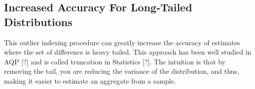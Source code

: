 \subsection{Increased Accuracy For Long-Tailed Distributions}

This outlier indexing procedure can greatly increase the accuracy
of estimates where the set of difference is heavy tailed. This approach
has been well studied in AQP {[}?{]} and is called truncation in Statistics
{[}?{]}. The intuition is that by removing the tail, you are reducing
the variance of the distribution, and thus, making it easier to estimate
an aggregate from a sample.